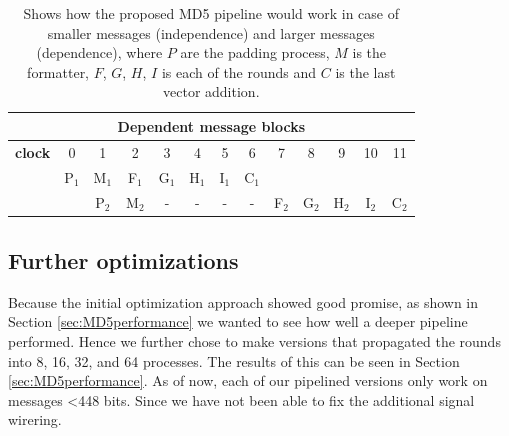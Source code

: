 \documentclass[a4paper, openany]{book}
\begin{document}
\begin{table}[H]
\captionsetup{width=.8\linewidth}
\centering
{}
\newline
\vspace*{0.5cm}
\newline
\centering
\begin{tabular}{c c c c c c c c c c c c c}
\hline
\multicolumn{13}{c}{Dependent message blocks}\\
\hline
\textbf{clock} & 0   &  1  &  2  &  3  &  4   & 5 &  6 &     7 &    8  & 9   &    10  &    11\\
\hline
               & P$_1$ & M$_1$ & F$_1$ & G$_1$ & H$_1$  & I$_1$ & C$_1$ &     &        &         &       &     \\
               &       & P$_2$ & M$_2$ &   -   &   -    &   -    &   -   & F$_2$ & G$_2$ & H$_2$  & I$_2$ & C$_2$ \\
\end{tabular}
\caption[MD5 pipeline]%
{Shows how the proposed MD5 pipeline would work in case of smaller messages (independence) and larger messages (dependence), where $P$ are the padding process, $M$ is the formatter, $F$, $G$, $H$, $I$ is each of the rounds and $C$ is the last vector addition.}
\label{tab:MD5pipeline}
\end{table}

\subsection{Further optimizations}
\label{sec:org93927d4}
Because the initial optimization approach showed good promise, as shown in Section \ref{sec:MD5performance} we wanted to see how well a deeper pipeline performed. Hence we further chose to make versions that propagated the rounds into 8, 16, 32, and 64 processes. The results of this can be seen in Section \ref{sec:MD5performance}. As of now, each of our pipelined versions only work on messages <448 bits. Since we have not been able to fix the additional signal wirering.
\end{document}
